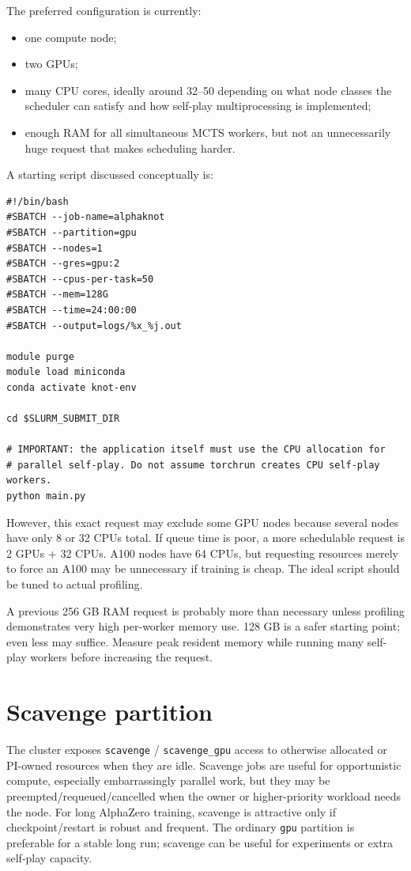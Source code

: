 \documentclass[11pt]{article}
\begin{document}
The preferred configuration is currently:

\begin{itemize}
    \item one compute node;
    \item two GPUs;
    \item many CPU cores, ideally around 32--50 depending on what node classes the scheduler can satisfy and how self-play multiprocessing is implemented;
    \item enough RAM for all simultaneous MCTS workers, but not an unnecessarily huge request that makes scheduling harder.
\end{itemize}

A starting script discussed conceptually is:

\begin{verbatim}
#!/bin/bash
#SBATCH --job-name=alphaknot
#SBATCH --partition=gpu
#SBATCH --nodes=1
#SBATCH --gres=gpu:2
#SBATCH --cpus-per-task=50
#SBATCH --mem=128G
#SBATCH --time=24:00:00
#SBATCH --output=logs/%x_%j.out

module purge
module load miniconda
conda activate knot-env

cd $SLURM_SUBMIT_DIR

# IMPORTANT: the application itself must use the CPU allocation for
# parallel self-play. Do not assume torchrun creates CPU self-play workers.
python main.py
\end{verbatim}

However, this exact request may exclude some GPU nodes because several nodes have only 8 or 32 CPUs total. If queue time is poor, a more schedulable request is 2 GPUs + 32 CPUs. A100 nodes have 64 CPUs, but requesting resources merely to force an A100 may be unnecessary if training is cheap. The ideal script should be tuned to actual profiling.

A previous 256 GB RAM request is probably more than necessary unless profiling demonstrates very high per-worker memory use. 128 GB is a safer starting point; even less may suffice. Measure peak resident memory while running many self-play workers before increasing the request.

\section{Scavenge partition}

The cluster exposes \texttt{scavenge} / \texttt{scavenge\_gpu} access to otherwise allocated or PI-owned resources when they are idle. Scavenge jobs are useful for opportunistic compute, especially embarrassingly parallel work, but they may be preempted/requeued/cancelled when the owner or higher-priority workload needs the node. For long AlphaZero training, scavenge is attractive only if checkpoint/restart is robust and frequent. The ordinary \texttt{gpu} partition is preferable for a stable long run; scavenge can be useful for experiments or extra self-play capacity.
\end{document}
